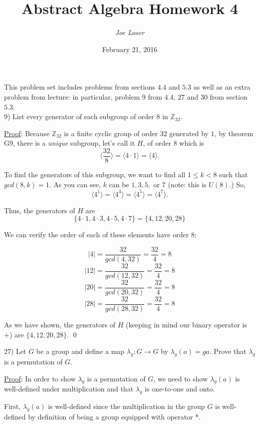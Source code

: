 \documentclass{article}
\title{Abstract Algebra Homework 4}
\author{\textit{Joe Loser}}
\date{February 21, 2016}
\begin{document}
\maketitle

This problem set includes problems from sections $4.4$ and $5.3$ as well as an extra problem from lecture: in particular, problem $9$ from $4.4$, $27$ and $30$ from section $5.3$. \\

9) List every generator of each subgroup of order $8$ in $\mathbb{Z}_{32}.$

\underline{Proof}: Because $\mathbb{Z}_{32}$ is a finite cyclic group of order $32$ generated by $1$, by theorem G9, there is a \textit{unique} subgroup, let's call it $H$, of order $8$ which is 
$$ \Bigg \langle \frac{32}{8} \Bigg \rangle = \Bigg \langle 4 \cdot 1 \Bigg \rangle = \Bigg \langle 4 \Bigg \rangle. $$

To find the generators of this subgroup, we want to find all $1 \le k < 8$ such that $gcd(8, k) = 1.$ As you can see, $k$ can be $1, 3, 5,$ or $7$ (note: this is $U(8)$.) So,
$$ \langle 4^{1} \rangle = \langle 4^{3} \rangle = \langle 4^{5} \rangle = \langle 4^{7} \rangle .$$

Thus, the generators of $H$ are 
$$ \{ 4 \cdot 1, 4 \cdot 3, 4 \cdot 5, 4 \cdot 7 \} = \{4, 12, 20, 28\} $$

We can verify the order of each of these elements have order $8$:

$$ \lvert 4 \rvert = \frac{32}{gcd(4, 32)} = \frac{32}{4} = 8 $$
$$ \lvert 12 \rvert = \frac{32}{gcd(12, 32)} = \frac{32}{4} = 8 $$
$$ \lvert 20 \rvert = \frac{32}{gcd(20, 32)} = \frac{32}{4} = 8 $$
$$ \lvert 28 \rvert = \frac{32}{gcd(28, 32)} = \frac{32}{4} = 8 $$

As we have shown, the generators of $H$ (keeping in mind our binary operator is +) are $\{4, 12, 20, 28\}.$ \qed \\ \newpage

27) Let $G$ be a group and define a map $\lambda _g : G \to G$ by $\lambda _g(a) = ga.$ Prove that $\lambda _g$ is a permutation of $G.$ 

\underline{Proof}: In order to show $\lambda _g$ is a permutation of $G$, we need to show $\lambda _g(a)$ is well-defined under multiplication and that $\lambda _g$ is one-to-one and onto.

First, $\lambda _g(a)$ is well-defined since the multiplication in the group $G$ is well-defined by definition of being a group equipped with operator *.
\end{document}

